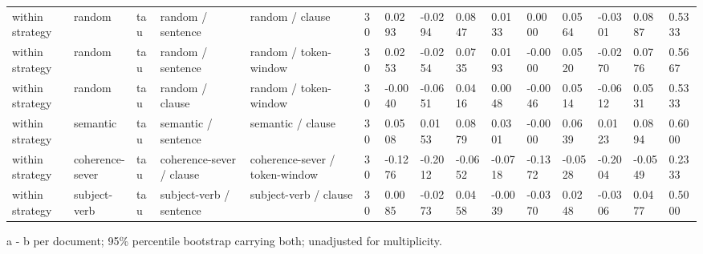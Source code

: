 \begin{table}[t]
{\begin{tabular}{lllllllllllllll}
within strategy & random & tau & random / sentence & random / clause & 30 & 0.0293 & -0.0294 & 0.0847 & 0.0133 & 0.0000 & 0.0564 & -0.0301 & 0.0887 & 0.5333 \\
within strategy & random & tau & random / sentence & random / token-window & 30 & 0.0253 & -0.0254 & 0.0735 & 0.0193 & -0.0000 & 0.0520 & -0.0270 & 0.0776 & 0.5667 \\
within strategy & random & tau & random / clause & random / token-window & 30 & -0.0040 & -0.0651 & 0.0416 & 0.0048 & -0.0046 & 0.0514 & -0.0612 & 0.0531 & 0.5333 \\
within strategy & semantic & tau & semantic / sentence & semantic / clause & 30 & 0.0508 & 0.0153 & 0.0879 & 0.0301 & -0.0000 & 0.0639 & 0.0123 & 0.0894 & 0.6000 \\
within strategy & coherence-sever & tau & coherence-sever / clause & coherence-sever / token-window & 30 & -0.1276 & -0.2012 & -0.0652 & -0.0718 & -0.1372 & -0.0528 & -0.2004 & -0.0549 & 0.2333 \\
within strategy & subject-verb & tau & subject-verb / sentence & subject-verb / clause & 30 & 0.0085 & -0.0273 & 0.0458 & -0.0039 & -0.0370 & 0.0248 & -0.0306 & 0.0477 & 0.5000 \\
\bottomrule
\end{tabular}}
\par\smallskip\parbox{\linewidth}{\tiny a - b per document; 95\% percentile bootstrap carrying both; unadjusted for multiplicity.}
\end{table}

